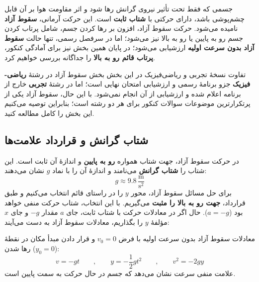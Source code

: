 \documentclass[12pt, a4paper]{article}
\begin{document}
جسمی که فقط تحت تأثیر نیروی گرانش رها شود و اثر مقاومت هوا بر آن قابل چشم‌پوشی باشد، دارای حرکتی با \textbf{شتاب ثابت} است. این حرکت آرمانی، \textbf{سقوط آزاد} نامیده می‌شود. حرکت سقوط آزاد، افزون بر رها کردن جسم، شامل پرتاب کردن جسم رو به پایین یا رو به بالا نیز می‌شود؛ اما در سرفصل رسمی، تنها حالت \textbf{سقوط آزاد بدون سرعت اولیه} ارزشیابی می‌شود؛ در پایان همین بخش نیز برای آمادگی کنکور، \textbf{پرتاب قائم رو به بالا} را جداگانه بررسی خواهیم کرد.

\begin{tipbox}{تفاوت نسخهٔ تجربی و ریاضی‌فیزیک در این بخش}
بخش سقوط آزاد در رشتهٔ \textbf{ریاضی-فیزیک} جزو برنامهٔ رسمی و ارزشیابی امتحان نهایی است؛ اما در رشتهٔ \textbf{تجربی} خارج از برنامه اعلام شده و ارزشیابی از آن انجام نمی‌شود. با این حال، سقوط آزاد یکی از پرتکرارترین موضوعات سوالات کنکور برای هر دو رشته است؛ بنابراین توصیه می‌کنیم این بخش را کامل مطالعه کنید.
\end{tipbox}

\subsection{شتاب گرانش و قرارداد علامت‌ها}

در حرکت سقوط آزاد، جهت شتاب همواره \textbf{رو به پایین} و اندازهٔ آن ثابت است. این شتاب را \textbf{شتاب گرانش} می‌نامند و اندازهٔ آن را با نماد $g$ نشان می‌دهند:
\[
g \approx 9.8\,\frac{\text{m}}{\text{s}^2}
\]
برای حل مسائل سقوط آزاد، محور $y$ را در راستای قائم انتخاب می‌کنیم و طبق قرارداد، \textbf{جهت رو به بالا را مثبت} می‌گیریم. با این انتخاب، شتاب حرکت منفی خواهد بود ($a = -g$). حال اگر در معادلات حرکت با شتاب ثابت، جای $a$ مقدار $-g$ و جای $x$ مؤلفهٔ $y$ را بگذاریم، معادلات سقوط آزاد به دست می‌آیند:

\begin{conceptbox}{معادلات سقوط آزاد بدون سرعت اولیه}
با فرض $v_0 = 0$ و قرار دادن مبدأ مکان در نقطهٔ رها شدن ($y_0 = 0$):
\[
v = -gt
\qquad , \qquad
y = -\frac{1}{2}gt^2
\qquad , \qquad
v^2 = -2gy
\]
علامت منفی سرعت نشان می‌دهد که جسم در حال حرکت به سمت پایین است.
\end{conceptbox}
\end{document}
